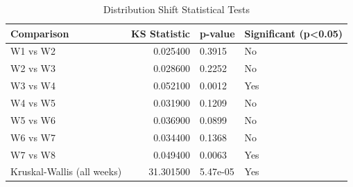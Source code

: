 \begin{table}
\caption{Distribution Shift Statistical Tests}
\label{tab:dist_shift_tests}
\begin{tabular}{lrll}
\toprule
Comparison & KS Statistic & p-value & Significant (p<0.05) \\
\midrule
W1 vs W2 & 0.025400 & 0.3915 & No \\
W2 vs W3 & 0.028600 & 0.2252 & No \\
W3 vs W4 & 0.052100 & 0.0012 & Yes \\
W4 vs W5 & 0.031900 & 0.1209 & No \\
W5 vs W6 & 0.036900 & 0.0899 & No \\
W6 vs W7 & 0.034400 & 0.1368 & No \\
W7 vs W8 & 0.049400 & 0.0063 & Yes \\
Kruskal-Wallis (all weeks) & 31.301500 & 5.47e-05 & Yes \\
\bottomrule
\end{tabular}
\end{table}
